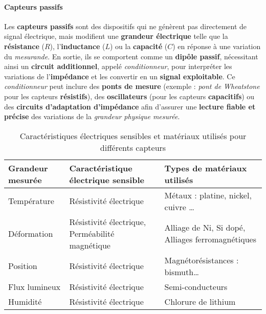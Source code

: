 \paragraph{Capteurs passifs}  
Les \textbf{capteurs passifs} sont des dispositifs qui ne génèrent pas 
directement de signal électrique, mais modifient une \textbf{grandeur électrique} 
telle que la \textbf{résistance} (\( R \)), l'\textbf{inductance} (\( L \)) ou 
la \textbf{capacité} (\( C \)) en réponse à une variation du \textit{mesurande}. 
En sortie, ils se comportent comme un \textbf{dipôle passif}, nécessitant ainsi 
un \textbf{circuit additionnel}, appelé \textit{conditionneur}, pour interpréter 
les variations de l'\textbf{impédance} et les convertir en un 
\textbf{signal exploitable}. Ce \textit{conditionneur} peut inclure des 
\textbf{ponts de mesure} (exemple : \textit{pont de Wheatstone} pour les 
capteurs \textbf{résistifs}), des \textbf{oscillateurs} (pour les capteurs 
\textbf{capacitifs}) ou des \textbf{circuits d'adaptation d'impédance} afin 
d'assurer une \textbf{lecture fiable et précise} des variations de la 
\textit{grandeur physique mesurée}.


\begin{table}[h]
    \centering
    \renewcommand{\arraystretch}{1.3}
    \renewcommand\tabularxcolumn[1]{m{#1}}
    \begin{tabularx}{\textwidth}{|>{\centering\arraybackslash}X|>{\raggedright\arraybackslash}X|>{\raggedright\arraybackslash}X|}
        \hline
        \textbf{Grandeur mesurée} & \textbf{Caractéristique électrique sensible} & \textbf{Types de matériaux utilisés} \\
        \hline
        Température & Résistivité électrique & Métaux : platine, nickel, cuivre … \\
        \hline
        Déformation & Résistivité électrique, Perméabilité magnétique & Alliage de Ni, Si dopé, Alliages ferromagnétiques \\
        \hline
        Position & Résistivité électrique & Magnétorésistances : bismuth… \\
        \hline
        Flux lumineux & Résistivité électrique & Semi-conducteurs \\
        \hline
        Humidité & Résistivité électrique & Chlorure de lithium \\
        \hline
    \end{tabularx}
    \caption{Caractéristiques électriques sensibles et matériaux utilisés pour différents capteurs}
    \label{tabCaracteristiquesCapteurs}
\end{table}

